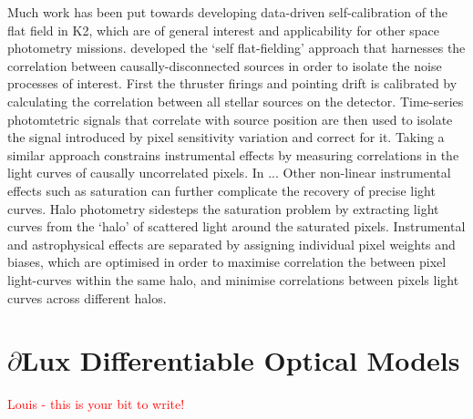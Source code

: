 \documentclass[twocolumn]{spie}
\newcommand\dlux{$\partial$Lux\xspace}
\begin{document}
Much work has been put towards developing data-driven self-calibration of the flat field in K2, which are of general interest and applicability for other space photometry missions. 
\citet{self_flat-fielding} developed the `self flat-fielding' approach that harnesses the correlation between causally-disconnected sources in order to isolate the noise processes of interest. First the thruster firings and pointing drift is calibrated by calculating the correlation between all stellar sources on the detector. Time-series photomtetric signals that correlate with source position are then used to isolate the signal introduced by pixel sensitivity variation and correct for it.
Taking a similar approach \citet{causal_pixel} constrains instrumental effects by measuring correlations in the light curves of causally uncorrelated pixels.
In \citet{pixel_decorr} ... 
Other non-linear instrumental effects such as saturation can further complicate the recovery of precise light curves. Halo photometry \citep{halo, halo2} sidesteps the saturation problem by extracting light curves from the `halo' of scattered light around the saturated pixels. Instrumental and astrophysical effects are separated by assigning individual pixel weights and biases, which are optimised in order to maximise correlation the between pixel light-curves within the same halo, and minimise correlations between pixels light curves across different halos.



\section{\dlux Differentiable Optical Models}
\label{sec:dlux}
\textcolor{red}{Louis - this is your bit to write!}

\end{document}
